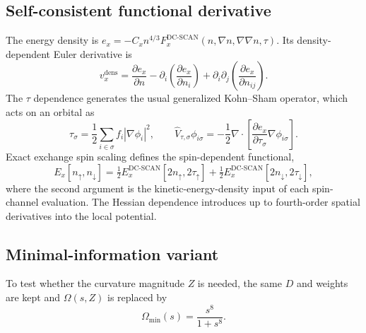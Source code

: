 \documentclass[journal=jctcce,manuscript=article]{achemso}
\begin{document}
\subsection{Self-consistent functional derivative}
\label{app:scf}
The energy density is
$e_x=-C_xn^{4/3}F_x^{\mathrm{DC\text{-}SCAN}}(n,\nabla n,\nabla\nabla n,\tau)$.
Its density-dependent Euler derivative is
\begin{equation}
v_x^{\mathrm{dens}}=\frac{\partial e_x}{\partial n}
-\partial_i\!\left(\frac{\partial e_x}{\partial n_i}\right)
+\partial_i\partial_j\!\left(\frac{\partial e_x}{\partial n_{ij}}\right).
\label{eq:dc-v}
\end{equation}
The $\tau$ dependence generates the usual generalized Kohn--Sham operator,
which acts on an orbital as
\begin{equation}
\tau_\sigma=\frac12\sum_{i\in\sigma}f_i|\nabla\phi_i|^2,\qquad
\hat V_{\tau,\sigma}\phi_{i\sigma}=-\frac12\nabla\cdot
\left[\frac{\partial e_x}{\partial\tau_\sigma}\nabla\phi_{i\sigma}\right].
\label{eq:dc-vtau}
\end{equation}
Exact exchange spin scaling defines the spin-dependent functional,
\begin{equation}
E_x[n_\uparrow,n_\downarrow]=\tfrac12E_x^{\mathrm{DC\text{-}SCAN}}[2n_\uparrow,2\tau_\uparrow]
+\tfrac12E_x^{\mathrm{DC\text{-}SCAN}}[2n_\downarrow,2\tau_\downarrow],
\label{eq:dc-spin}
\end{equation}
where the second argument is the kinetic-energy-density input of each
spin-channel evaluation.  The Hessian dependence introduces up to
fourth-order spatial derivatives into the local potential.

\subsection{Minimal-information variant}
To test whether the curvature magnitude $Z$ is needed, the same $D$ and
weights are kept and $\Omega(s,Z)$ is replaced by
\begin{equation}
\Omega_{\min}(s)=\frac{s^8}{1+s^8}.
\label{eq:dc-Omegamin}
\end{equation}
\end{document}
